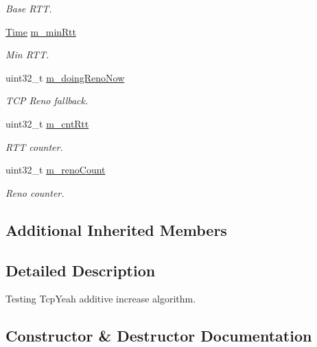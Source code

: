 \begin{DoxyCompactItemize}
\begin{DoxyCompactList}\small\item\em Base R\+TT. \end{DoxyCompactList}\item 
\hyperlink{classns3_1_1Time}{Time} \hyperlink{classTcpYeahIncrementTest_adc856d8e85a4fe25a0445228fe98f2d5}{m\+\_\+min\+Rtt}
\begin{DoxyCompactList}\small\item\em Min R\+TT. \end{DoxyCompactList}\item 
uint32\+\_\+t \hyperlink{classTcpYeahIncrementTest_a6e13a25e0b54b55dc2b30303ef5db80f}{m\+\_\+doing\+Reno\+Now}
\begin{DoxyCompactList}\small\item\em T\+CP Reno fallback. \end{DoxyCompactList}\item 
uint32\+\_\+t \hyperlink{classTcpYeahIncrementTest_ae374626ccd1961d37291bf1dd066833a}{m\+\_\+cnt\+Rtt}
\begin{DoxyCompactList}\small\item\em R\+TT counter. \end{DoxyCompactList}\item 
uint32\+\_\+t \hyperlink{classTcpYeahIncrementTest_abef7ecc57097eb21573a3efdd133229c}{m\+\_\+reno\+Count}
\begin{DoxyCompactList}\small\item\em Reno counter. \end{DoxyCompactList}\end{DoxyCompactItemize}
\subsection*{Additional Inherited Members}


\subsection{Detailed Description}
Testing Tcp\+Yeah additive increase algorithm. 

\subsection{Constructor \& Destructor Documentation}

